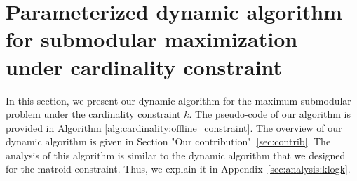 \documentclass[11pt]{article}
\begin{document}
 













 

  














  



  
  
  
  
  
  






  


   
   

  










\section{Parameterized dynamic algorithm for submodular maximization under cardinality constraint}
\label{sec:klogk}
In this section, we present our dynamic algorithm for the maximum submodular problem under the cardinality constraint $k$.
The pseudo-code of our algorithm is provided in Algorithm \ref{alg:cardinality:offline_constraint}. 
The overview of our dynamic algorithm is given in Section "Our contribution"~\ref{sec:contrib}. 
The analysis of this algorithm is similar to the dynamic algorithm that we designed for the matroid constraint. 
Thus, we explain it in Appendix~\ref{sec:analysis:klogk}. 
\end{document}
